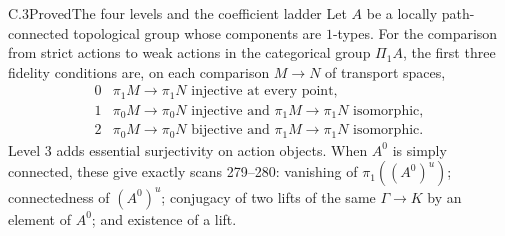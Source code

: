 \begin{claim}{C.3}{Proved}{The four levels and the coefficient ladder}
Let $A$ be a locally path-connected topological group whose components
are $1$-types. For the comparison from strict actions to weak actions in
the categorical group $\Pi_1A$, the first three fidelity conditions are,
on each comparison $M\to N$ of transport spaces,
\[
\begin{array}{c|l}
0&\pi_1M\to\pi_1N\text{ injective at every point},\\
1&\pi_0M\to\pi_0N\text{ injective and }\pi_1M\to\pi_1N\text{ isomorphic},\\
2&\pi_0M\to\pi_0N\text{ bijective and }\pi_1M\to\pi_1N\text{ isomorphic}.
\end{array}
\]
Level $3$ adds essential surjectivity on action objects. When $A^0$ is
simply connected, these give exactly scans 279--280: vanishing of
$\pi_1((A^0)^u)$; connectedness of $(A^0)^u$; conjugacy of two lifts of the
same $\Gamma\to K$ by an element of $A^0$; and existence of a lift.
\end{claim}
